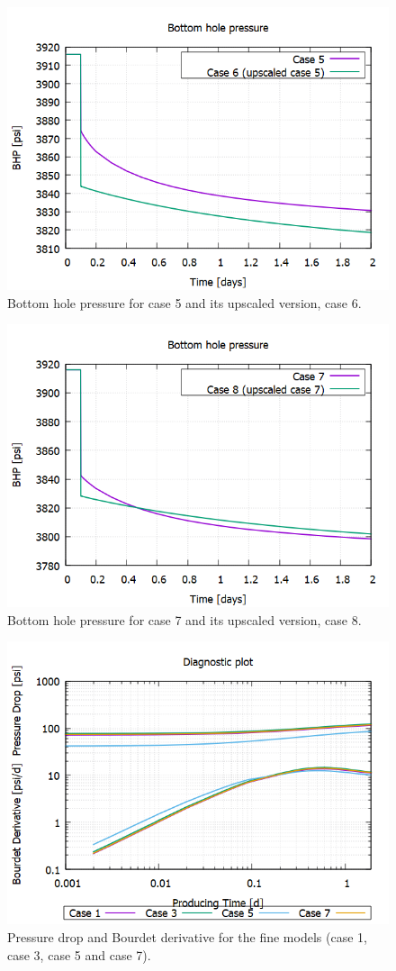 \begin{figure}[H]
	\centering
	\includegraphics[width=0.8\linewidth]{Images/49}
	\caption{Bottom hole pressure for case 5 and its upscaled version, case 6.}
	\label{fig:49}
\end{figure}

\begin{figure}[H]
	\centering
	\includegraphics[width=0.8\linewidth]{Images/50}
	\caption{Bottom hole pressure for case 7 and its upscaled version, case 8.}
	\label{fig:50}
\end{figure}

\begin{figure}[H]
	\centering
	\includegraphics[width=0.8\linewidth]{Images/51}
	\caption{Pressure drop and Bourdet derivative for the fine models (case 1, case 3, case 5 and case 7).}
	\label{fig:51}
\end{figure}

